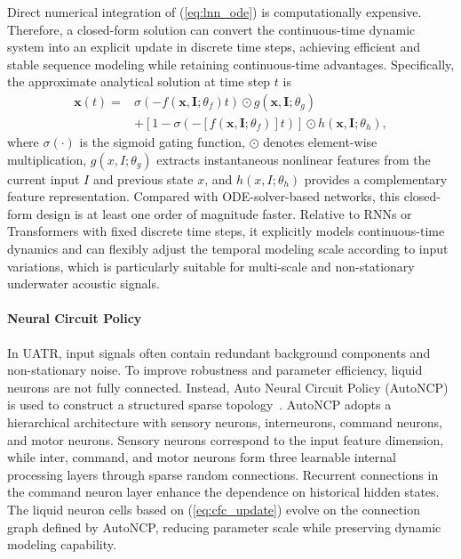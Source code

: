 ﻿\documentclass[lettersize,journal]{IEEEtran}
\begin{document}
Direct numerical integration of (\ref{eq:lnn_ode}) is computationally expensive. Therefore, a closed-form solution can convert the continuous-time dynamic system into an explicit update in discrete time steps, achieving efficient and stable sequence modeling while retaining continuous-time advantages. Specifically, the approximate analytical solution at time step $t$ is
\begin{equation}
\begin{split}
\mathbf{x}(t) =& \sigma\left(-f(\mathbf{x}, \mathbf{I}; \theta_f) t\right) \odot g(\mathbf{x}, \mathbf{I}; \theta_g) \\
& + \left[1 - \sigma\left(-\left[f(\mathbf{x}, \mathbf{I}; \theta_f)\right] t\right)\right] \odot h(\mathbf{x}, \mathbf{I}; \theta_h),
\end{split}
\label{eq:cfc_update}
\end{equation}
where $\sigma(\cdot)$ is the sigmoid gating function, $\odot$ denotes element-wise multiplication, $g(x, I; \theta_g)$ extracts instantaneous nonlinear features from the current input $I$ and previous state $x$, and $h(x, I; \theta_h)$ provides a complementary feature representation. Compared with ODE-solver-based networks, this closed-form design is at least one order of magnitude faster. Relative to RNNs or Transformers with fixed discrete time steps, it explicitly models continuous-time dynamics and can flexibly adjust the temporal modeling scale according to input variations, which is particularly suitable for multi-scale and non-stationary underwater acoustic signals.

\paragraph{Neural Circuit Policy}
In UATR, input signals often contain redundant background components and non-stationary noise. To improve robustness and parameter efficiency, liquid neurons are not fully connected. Instead, Auto Neural Circuit Policy (AutoNCP) is used to construct a structured sparse topology~\cite{Lechner2020NCP}. AutoNCP adopts a hierarchical architecture with sensory neurons, interneurons, command neurons, and motor neurons. Sensory neurons correspond to the input feature dimension, while inter, command, and motor neurons form three learnable internal processing layers through sparse random connections. Recurrent connections in the command neuron layer enhance the dependence on historical hidden states. The liquid neuron cells based on (\ref{eq:cfc_update}) evolve on the connection graph defined by AutoNCP, reducing parameter scale while preserving dynamic modeling capability.
\end{document}
